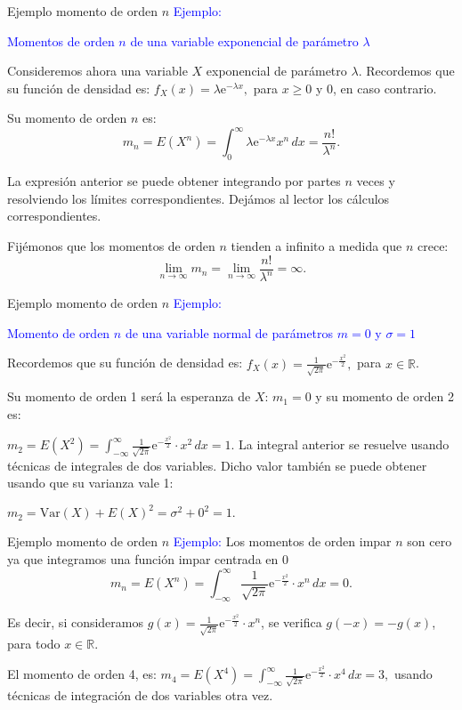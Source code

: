 \documentclass[
  ignorenonframetext,
  aspectratio=169]{beamer}
\newcommand\blue[1]{\textcolor{blue}{#1}}
\begin{document}
\begin{frame}{Ejemplo momento de orden \(n\)}
\protect\hypertarget{ejemplo-momento-de-orden-n-1}{}
\blue{Ejemplo:}

\blue{Momentos de orden $n$ de una variable exponencial de parámetro $\lambda$}

Consideremos ahora una variable \(X\) exponencial de parámetro
\(\lambda\). Recordemos que su función de densidad es:
\(f_X(x)=\lambda \mathrm{e}^{-\lambda x},\) para \(x\geq 0\) y \(0\), en
caso contrario.

Su momento de orden \(n\) es: \[
m_n = E\left(X^n\right)=\int_0^\infty \lambda \mathrm{e}^{-\lambda x} x^n\, dx =\frac{n!}{\lambda^n}.
\]

La expresión anterior se puede obtener integrando por partes \(n\) veces
y resolviendo los límites correspondientes. Dejámos al lector los
cálculos correspondientes.

Fijémonos que los momentos de orden \(n\) tienden a infinito a medida
que \(n\) crece:
\[\lim\limits_{n\to\infty}m_n = \lim\limits_{n\to\infty}\frac{n!}{\lambda^n}=\infty.\]
\end{frame}

\begin{frame}{Ejemplo momento de orden \(n\)}
\protect\hypertarget{ejemplo-momento-de-orden-n-2}{}
\blue{Ejemplo:}

\blue{Momento de orden $n$ de una variable normal de parámetros $m=0$ y $\sigma =1$}

Recordemos que su función de densidad es:
\(f_X(x)=\frac{1}{\sqrt{2\pi}}\mathrm{e}^{-\frac{x^2}{2}},\) para
\(x\in \mathbb{R}\).

Su momento de orden 1 será la esperanza de \(X\): \(m_1 = 0\) y su
momento de orden 2 es:

\(m_2 = E\left(X^2\right)=\int_{-\infty}^\infty \frac{1}{\sqrt{2\pi}}\mathrm{e}^{-\frac{x^2}{2}}\cdot x^2\, dx = 1.\)
La integral anterior se resuelve usando técnicas de integrales de dos
variables. Dicho valor también se puede obtener usando que su varianza
vale 1:

\(m_2 = \mathrm{Var}(X)+E(X)^2 = \sigma^2 + 0^2 = 1.\)
\end{frame}

\begin{frame}{Ejemplo momento de orden \(n\)}
\protect\hypertarget{ejemplo-momento-de-orden-n-3}{}
\blue{Ejemplo:} Los momentos de orden impar \(n\) son cero ya que
integramos una función impar centrada en \(0\)
\[m_n = E\left(X^n\right)=\int_{-\infty}^\infty \frac{1}{\sqrt{2\pi}}\mathrm{e}^{-\frac{x^2}{2}}\cdot x^n\, dx = 0.\]

Es decir, si consideramos
\(g(x)=\frac{1}{\sqrt{2\pi}}\mathrm{e}^{-\frac{x^2}{2}}\cdot x^n\), se
verifica \(g(-x)=-g(x)\), para todo \(x\in\mathbb{R}\).

El momento de orden 4, es:
\(m_4 = E\left(X^4\right)=\int_{-\infty}^\infty \frac{1}{\sqrt{2\pi}}\mathrm{e}^{-\frac{x^2}{2}}\cdot x^4\, dx = 3,\)
usando técnicas de integración de dos variables otra vez.
\end{frame}
\end{document}
